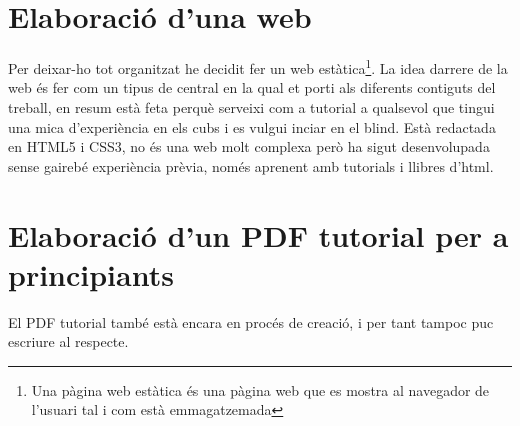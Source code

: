 \section{Elaboració d'una web}

Per deixar-ho tot organitzat he decidit fer un web estàtica\footnote{Una pàgina web estàtica és una pàgina web que es mostra al navegador de l'usuari tal i com està emmagatzemada}. La idea darrere de la web és fer com un tipus de central en la qual et porti als diferents contiguts del treball, en resum està feta perquè serveixi com a tutorial a qualsevol que tingui una mica d'experiència en els cubs i es vulgui inciar en el blind.
Està redactada en HTML5 i CSS3, no és una web molt complexa però ha sigut desenvolupada sense gairebé experiència prèvia, només aprenent amb tutorials i llibres d'html.

\section{Elaboració d'un PDF tutorial per a principiants}

El PDF tutorial també està encara en procés de creació, i per tant tampoc puc escriure al respecte.





